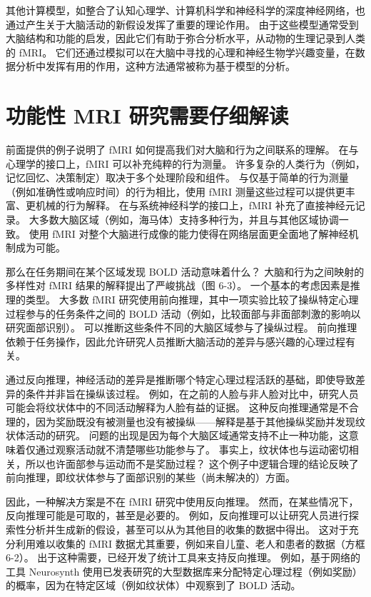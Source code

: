 其他计算模型，如整合了认知心理学、计算机科学和神经科学的深度神经网络，也通过产生关于大脑活动的新假设发挥了重要的理论作用。 由于这些模型通常受到大脑结构和功能的启发，因此它们有助于弥合分析水平，从动物的生理记录到人类的 fMRI。 它们还通过模拟可以在大脑中寻找的心理和神经生物学兴趣变量，在数据分析中发挥有用的作用，这种方法通常被称为基于模型的分析。



\section{功能性 MRI 研究需要仔细解读}

前面提供的例子说明了 fMRI 如何提高我们对大脑和行为之间联系的理解。 在与心理学的接口上，fMRI 可以补充纯粹的行为测量。 许多复杂的人类行为（例如，记忆回忆、决策制定）取决于多个处理阶段和组件。 与仅基于简单的行为测量（例如准确性或响应时间）的行为相比，使用 fMRI 测量这些过程可以提供更丰富、更机械的行为解释。 在与系统神经科学的接口上，fMRI 补充了直接神经元记录。 大多数大脑区域（例如，海马体）支持多种行为，并且与其他区域协调一致。 使用 fMRI 对整个大脑进行成像的能力使得在网络层面更全面地了解神经机制成为可能。

那么在任务期间在某个区域发现 BOLD 活动意味着什么？ 大脑和行为之间映射的多样性对 fMRI 结果的解释提出了严峻挑战（图 6-3）。 一个基本的考虑因素是推理的类型。 大多数 fMRI 研究使用前向推理，其中一项实验比较了操纵特定心理过程参与的任务条件之间的 BOLD 活动（例如，比较面部与非面部刺激的影响以研究面部识别）。 可以推断这些条件不同的大脑区域参与了操纵过程。 前向推理依赖于任务操作，因此允许研究人员推断大脑活动的差异与感兴趣的心理过程有关。

通过反向推理，神经活动的差异是推断哪个特定心理过程活跃的基础，即使导致差异的条件并非旨在操纵该过程。 例如，在之前的人脸与非人脸对比中，研究人员可能会将纹状体中的不同活动解释为人脸有益的证据。 这种反向推理通常是不合理的，因为奖励既没有被测量也没有被操纵——解释是基于其他操纵奖励并发现纹状体活动的研究。 问题的出现是因为每个大脑区域通常支持不止一种功能，这意味着仅通过观察活动就不清楚哪些功能参与了。 事实上，纹状体也与运动密切相关，所以也许面部参与运动而不是奖励过程？ 这个例子中逻辑合理的结论反映了前向推理，即纹状体参与了面部识别的某些（尚未解决的）方面。

因此，一种解决方案是不在 fMRI 研究中使用反向推理。 然而，在某些情况下，反向推理可能是可取的，甚至是必要的。 例如，反向推理可以让研究人员进行探索性分析并生成新的假设，甚至可以从为其他目的收集的数据中得出。 这对于充分利用难以收集的 fMRI 数据尤其重要，例如来自儿童、老人和患者的数据（方框 6-2）。 出于这种需要，已经开发了统计工具来支持反向推理。 例如，基于网络的工具 Neurosynth 使用已发表研究的大型数据库来分配特定心理过程（例如奖励）的概率，因为在特定区域（例如纹状体）中观察到了 BOLD 活动。

